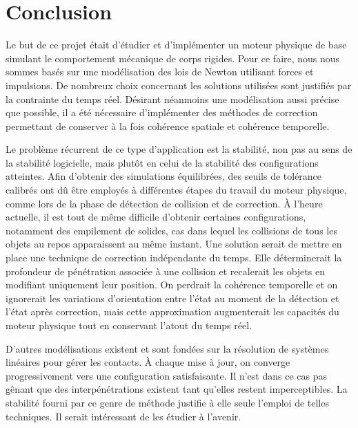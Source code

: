\section{Conclusion}

Le but de ce projet était d'étudier et d'implémenter un moteur
physique de base simulant le comportement mécanique de corps
rigides. Pour ce faire, nous nous sommes basés sur une modélisation
des lois de Newton utilisant forces et impulsions. De nombreux choix
concernant les solutions utilisées sont justifiés par la contrainte du
temps réel. Désirant néanmoins une modélisation aussi précise que
possible, il a été nécessaire d'implémenter des méthodes de correction
permettant de conserver à la fois cohérence spatiale et cohérence
temporelle.

Le problème récurrent de ce type d'application est la stabilité, non
pas au sens de la stabilité logicielle, mais plutôt en celui de la
stabilité des configurations atteintes. Afin d'obtenir des simulations
équilibrées, des seuils de tolérance calibrés ont dû être employés à
différentes étapes du travail du moteur physique, comme lors de la
phase de détection de collision et de correction. \`A l'heure
actuelle, il est tout de même difficile d'obtenir certaines
configurations, notamment des empilement de solides, cas dans lequel
les collisions de tous les objets au repos apparaissent au même
instant. Une solution serait de mettre en place une technique de
correction indépendante du temps. Elle déterminerait la profondeur de
pénétration associée à une collision et recalerait les objets en
modifiant uniquement leur position. On perdrait la cohérence
temporelle et on ignorerait les variations d'orientation entre l'état
au moment de la détection et l'état après correction, mais cette
approximation augmenterait les capacités du moteur physique tout en
conservant l'atout du temps réel.

D'autres modélisations existent et sont fondées sur la résolution de
systèmes linéaires pour gérer les contacts. \`A chaque mise à jour, on
converge progressivement vers une configuration satisfaisante. Il
n'est dans ce cas pas gênant que des interpénétrations existent tant
qu'elles restent imperceptibles. La stabilité fourni par ce genre de
méthode justifie à elle seule l'emploi de telles techniques. Il serait
intéressant de les étudier à l'avenir.
